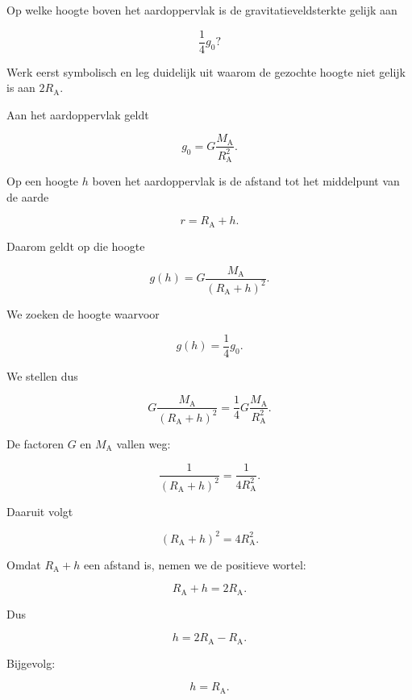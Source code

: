 \documentclass{ximera}
\begin{document}
\begin{oefening}{\oefU\ESS}

Op welke hoogte boven het aardoppervlak is de gravitatieveldsterkte
gelijk aan

\[
\frac14g_0?
\]

Werk eerst symbolisch en leg duidelijk uit waarom de gezochte hoogte
niet gelijk is aan $2R_\mathrm A$.

\begin{oplossing}

      Aan het aardoppervlak geldt
      
      \[
      g_0
      =
      G\frac{M_\mathrm A}{R_\mathrm A^2}.
      \]
      
      Op een hoogte $h$ boven het aardoppervlak is de afstand tot het
      middelpunt van de aarde
      
      \[
      r=R_\mathrm A+h.
      \]
      
      Daarom geldt op die hoogte
      
      \[
      g(h)
      =
      G\frac{M_\mathrm A}{(R_\mathrm A+h)^2}.
      \]
      
      We zoeken de hoogte waarvoor
      
      \[
      g(h)=\frac14g_0.
      \]
      
      We stellen dus
      
      \[
      G\frac{M_\mathrm A}{(R_\mathrm A+h)^2}
      =
      \frac14
      G\frac{M_\mathrm A}{R_\mathrm A^2}.
      \]
      
      De factoren $G$ en $M_\mathrm A$ vallen weg:
      
      \[
      \frac{1}{(R_\mathrm A+h)^2}
      =
      \frac{1}{4R_\mathrm A^2}.
      \]
      
      Daaruit volgt
      
      \[
      (R_\mathrm A+h)^2
      =
      4R_\mathrm A^2.
      \]
      
      Omdat $R_\mathrm A+h$ een afstand is, nemen we de positieve
      wortel:
      
      \[
      R_\mathrm A+h
      =
      2R_\mathrm A.
      \]
      
      Dus
      
      \[
      h
      =
      2R_\mathrm A-R_\mathrm A.
      \]
      
      Bijgevolg:
      
      \[
      \boxed{
      h=R_\mathrm A.
      }
      \]
      

\end{oplossing}
\end{oefening}
\end{document}
